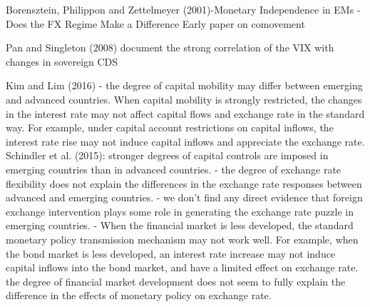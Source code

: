 Borensztein, Philippon and Zettelmeyer (2001)-Monetary Independence in EMs - Does the FX Regime Make a Difference
Early paper on comovement

Pan and Singleton (2008)
document the strong correlation of the VIX with changes in sovereign CDS

Kim and Lim (2016)
- the degree of capital mobility may differ between emerging and advanced countries. When capital mobility is strongly restricted, the changes in the interest rate may not affect capital flows and exchange rate in the standard way. For example, under capital account restrictions on capital inflows, the interest rate rise may not induce capital inflows and appreciate the exchange rate.
Schindler et al. (2015): stronger degrees of capital controls are imposed in emerging countries than in advanced countries.
- the degree of exchange rate flexibility does not explain the differences in the exchange rate responses between advanced and emerging countries.
- we don’t find any direct evidence that foreign exchange intervention plays some role
in generating the exchange rate puzzle in emerging countries.
- When the financial market is less developed, the standard monetary policy transmission mechanism may not work well. For example, when the bond market is less developed, an interest rate increase may not induce capital inflows into the bond market, and have a limited effect on exchange rate. the degree of financial market development does not seem to fully explain the difference in the effects of monetary policy on exchange rate.